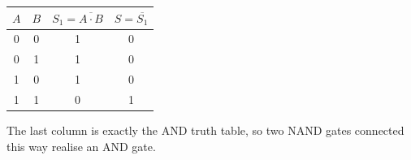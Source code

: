 \documentclass[11pt]{article}
\begin{document}
\begin{corrige}
\begin{enumerate}
\begin{center}
\begin{tabular}{|c|c|c|c|}
\hline
\rowcolor{popblueL} $A$ & $B$ & $S_1=\overline{A\cdot B}$ & $S=\overline{S_1}$ \\
\hline
0 & 0 & 1 & 0 \\
\hline
0 & 1 & 1 & 0 \\
\hline
1 & 0 & 1 & 0 \\
\hline
1 & 1 & 0 & 1 \\
\hline
\end{tabular}
\end{center}
The last column is exactly the AND truth table, so two NAND gates connected this way realise an AND gate.
\end{enumerate}
\end{corrige}
\end{document}
